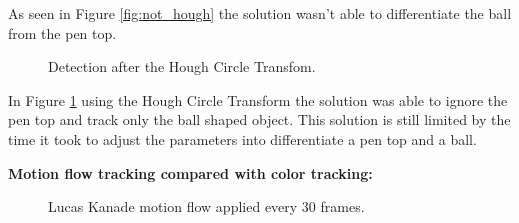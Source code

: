 \documentclass[10pt,twocolumn,letterpaper]{article}
\begin{document}
  As seen in Figure \ref{fig:not_hough} the solution wasn't able to
  differentiate the ball from the pen top.

  \begin{figure}[!h]
    \centering
    \setlength{\fboxsep}{1pt}
    \setlength{\fboxrule}{1pt}
    \caption{Detection after the Hough Circle Transfom.}
    \label{fig:yes_hough}
  \end{figure}

  In Figure \ref{fig:yes_hough} using the Hough Circle Transform the solution
  was able to ignore the pen top and track only the ball shaped object. This
  solution is still limited by the time it took to adjust the parameters into
  differentiate a pen top and a ball.

  \bigbreak
  \textbf{Motion flow tracking compared with color tracking:}
  \bigbreak

  \begin{figure}[!h]
    \centering
    \setlength{\fboxsep}{1pt}
    \setlength{\fboxrule}{1pt}
    \caption{Lucas Kanade motion flow applied every 30 frames.}
    \label{fig:motion_30}
  \end{figure}
\end{document}

